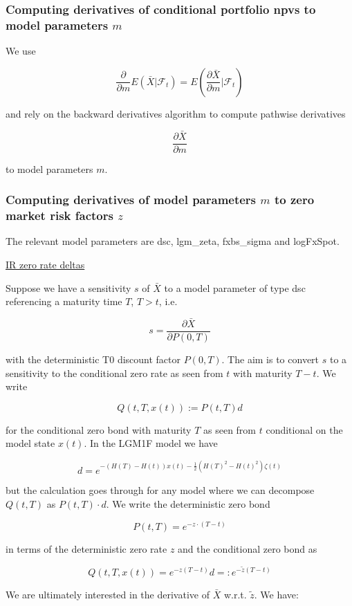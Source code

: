 \subsubsection{Computing derivatives of conditional portfolio npvs to model parameters $m$}

We use

$$
\frac{\partial}{\partial m}E\left( \bar{X} \bigg| \mathcal{F}_t \right) = E\left( \frac{\partial \bar{X}}{\partial m} \bigg| \mathcal{F}_t \right)
$$

and rely on the backward derivatives algorithm to compute pathwise derivatives

$$
\frac{\partial \bar{X}}{\partial m}
$$

to model parameters $m$.


\subsubsection{Computing derivatives of model parameters $m$ to zero market risk factors $z$}

The relevant model parameters are dsc, lgm\_zeta, fxbs\_sigma and logFxSpot.

\underline{IR zero rate deltas}

Suppose we have a sensitivity $s$ of $\bar{X}$ to a model parameter of type dsc referencing a maturity time $T$, $T >
t$, i.e.

$$
s = \frac{\partial\bar{X}}{\partial P(0,T)}
$$

with the deterministic T0 discount factor $P(0,T)$. The aim is to convert $s$ to a sensitivity to the conditional zero
rate as seen from $t$ with maturity $T-t$. We write

$$
Q(t,T,x(t)) := P(t,T) d
$$

for the conditional zero bond with maturity $T$ as seen from $t$ conditional on the model state $x(t)$. In the LGM1F
model we have

$$
d = e^{-(H(T)-H(t))x(t) - \frac{1}{2}( H(T)^2 - H(t)^2 ) \zeta(t)}
$$

but the calculation goes through for any model where we can decompose $Q(t,T)$ as $P(t,T)\cdot d$. We write the deterministic zero bond

$$
P(t,T) = e^{-z\cdot(T-t)}
$$

in terms of the deterministic zero rate $z$ and the conditional zero bond as

$$
Q(t,T,x(t)) = e^{-z (T-t)} d =: e^{-\tilde{z} (T-t)}
$$

We are ultimately interested in the derivative of $\bar{X}$ w.r.t. $\tilde{z}$. We have:

